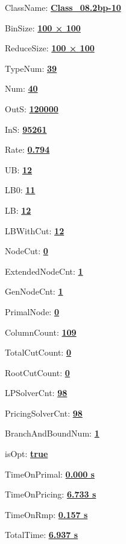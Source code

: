 \documentclass[11pt]{article}
\begin{document}
\pagestyle{empty}


ClassName: \underline{\textbf{Class_08.2bp-10}}
\par
BinSize: \underline{\textbf{100 × 100}}
\par
ReduceSize: \underline{\textbf{100 × 100}}
\par
TypeNum: \underline{\textbf{39}}
\par
Num: \underline{\textbf{40}}
\par
OutS: \underline{\textbf{120000}}
\par
InS: \underline{\textbf{95261}}
\par
Rate: \underline{\textbf{0.794}}
\par
UB: \underline{\textbf{12}}
\par
LB0: \underline{\textbf{11}}
\par
LB: \underline{\textbf{12}}
\par
LBWithCut: \underline{\textbf{12}}
\par
NodeCut: \underline{\textbf{0}}
\par
ExtendedNodeCnt: \underline{\textbf{1}}
\par
GenNodeCnt: \underline{\textbf{1}}
\par
PrimalNode: \underline{\textbf{0}}
\par
ColumnCount: \underline{\textbf{109}}
\par
TotalCutCount: \underline{\textbf{0}}
\par
RootCutCount: \underline{\textbf{0}}
\par
LPSolverCnt: \underline{\textbf{98}}
\par
PricingSolverCnt: \underline{\textbf{98}}
\par
BranchAndBoundNum: \underline{\textbf{1}}
\par
isOpt: \underline{\textbf{true}}
\par
TimeOnPrimal: \underline{\textbf{0.000 s}}
\par
TimeOnPricing: \underline{\textbf{6.733 s}}
\par
TimeOnRmp: \underline{\textbf{0.157 s}}
\par
TotalTime: \underline{\textbf{6.937 s}}
\par
\newpage


\end{document}
